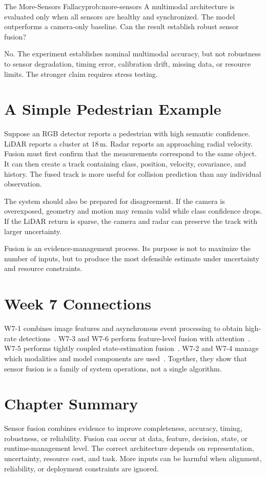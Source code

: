 \begin{problem}{The More-Sensors Fallacy}{prob:more-sensors}
A multimodal architecture is evaluated only when all sensors are healthy and synchronized. The model outperforms a camera-only baseline. Can the result establish robust sensor fusion?
\end{problem}

No. The experiment establishes nominal multimodal accuracy, but not robustness to sensor degradation, timing error, calibration drift, missing data, or resource limits. The stronger claim requires stress testing.

\section{A Simple Pedestrian Example}

Suppose an RGB detector reports a pedestrian with high semantic confidence. LiDAR reports a cluster at \(18\,\mathrm{m}\). Radar reports an approaching radial velocity. Fusion must first confirm that the measurements correspond to the same object. It can then create a track containing class, position, velocity, covariance, and history. The fused track is more useful for collision prediction than any individual observation.

The system should also be prepared for disagreement. If the camera is overexposed, geometry and motion may remain valid while class confidence drops. If the LiDAR return is sparse, the camera and radar can preserve the track with larger uncertainty.

\begin{keyinsight}
Fusion is an evidence-management process. Its purpose is not to maximize the number of inputs, but to produce the most defensible estimate under uncertainty and resource constraints.
\end{keyinsight}

\section{Week 7 Connections}

W7-1 combines image features and asynchronous event processing to obtain high-rate detections~\cite{gehrig2024lowlatency}. W7-3 and W7-6 perform feature-level fusion with attention~\cite{ichikawa2024remcim,zhang2026pentafusion}. W7-5 performs tightly coupled state-estimation fusion~\cite{wang2025fastlieo}. W7-2 and W7-4 manage which modalities and model components are used~\cite{zhang2023carma,yun2026fusionsense}. Together, they show that sensor fusion is a family of system operations, not a single algorithm.

\section{Chapter Summary}

Sensor fusion combines evidence to improve completeness, accuracy, timing, robustness, or reliability. Fusion can occur at data, feature, decision, state, or runtime-management level. The correct architecture depends on representation, uncertainty, resource cost, and task. More inputs can be harmful when alignment, reliability, or deployment constraints are ignored.
